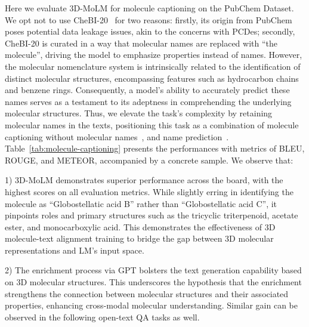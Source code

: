 Here we evaluate 3D-MoLM for molecule captioning on the PubChem Dataset. 
We opt not to use CheBI-20~\citep{molt5} for two reasons: firstly, its origin from PubChem poses potential data leakage issues, akin to the concerns with PCDes; secondly, CheBI-20 is curated in a way that molecular names are replaced with ``the molecule'', driving the model to emphasize properties instead of names. 
However, the molecular nomenclature system is intrinsically related to the identification of distinct molecular structures, encompassing features such as hydrocarbon chains and benzene rings. 
Consequently, a model's ability to accurately predict these names serves as a testament to its adeptness in comprehending the underlying molecular structures.
Thus, we elevate the task's complexity by retaining molecular names in the texts, positioning this task as a combination of molecule captioning without molecular names~\citep{molt5}, and name prediction~\citep{iupac-name}.
Table~\ref{tab:molecule-captioning} presents the performances with metrics of BLEU, ROUGE, and METEOR, accompanied by a concrete sample.
We observe that:

1) 3D-MoLM demonstrates superior performance across the board, with the highest scores on all evaluation metrics. 
While slightly erring in identifying the molecule as ``Globostellatic acid B'' rather than ``Globostellatic acid C'', it pinpoints roles and primary structures such as the tricyclic triterpenoid, acetate ester, and monocarboxylic acid.
This demonstrates the effectiveness of 3D molecule-text alignment training to bridge the gap between 3D molecular representations and LM's input space.
 
2) The enrichment process via GPT bolsters the text generation capability based on 3D molecular structures. 
This underscores the hypothesis that the enrichment strengthens the connection between molecular structures and their associated properties, enhancing cross-modal molecular understanding.
Similar gain can be observed in the following open-text QA tasks as well.

